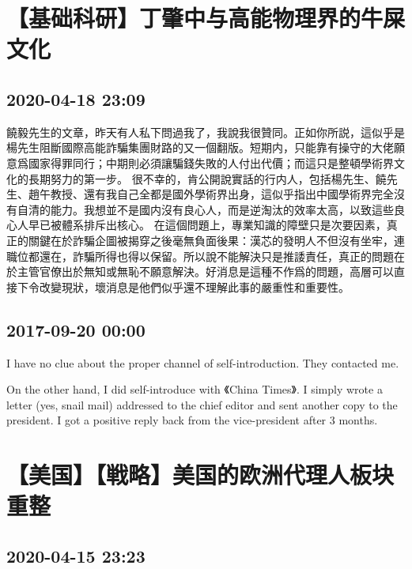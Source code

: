 \documentclass[twocolumn]{ctexart}
\begin{document}
\section*{【基础科研】丁肇中与高能物理界的牛屎文化}
\subsection*{2020-04-18 23:09}

饒毅先生的文章，昨天有人私下問過我了，我說我很贊同。正如你所説，這似乎是楊先生阻斷國際高能詐騙集團財路的又一個翻版。短期内，只能靠有操守的大佬願意爲國家得罪同行；中期則必須讓騙錢失敗的人付出代價；而這只是整頓學術界文化的長期努力的第一步。
很不幸的，肯公開說實話的行内人，包括楊先生、饒先生、趙午教授、還有我自己全都是國外學術界出身，這似乎指出中國學術界完全沒有自清的能力。我想並不是國内沒有良心人，而是逆淘汰的效率太高，以致這些良心人早已被體系排斥出核心。
在這個問題上，專業知識的障壁只是次要因素，真正的關鍵在於詐騙企圖被揭穿之後毫無負面後果：漢芯的發明人不但沒有坐牢，連職位都還在，詐騙所得也得以保留。所以說不能解決只是推諉責任，真正的問題在於主管官僚出於無知或無恥不願意解決。好消息是這種不作爲的問題，高層可以直接下令改變現狀，壞消息是他們似乎還不理解此事的嚴重性和重要性。
\subsection*{2017-09-20 00:00}
I have no clue about the proper channel of self-introduction. They contacted me.

On the other hand, I did self-introduce with 《China Times》. I simply wrote a letter (yes, snail mail) addressed to the chief editor and sent another copy to the president. I got a positive reply back from the vice-president after 3 months.\section*{【美国】【戦略】美国的欧洲代理人板块重整}
\subsection*{2020-04-15 23:23}
\end{document}
